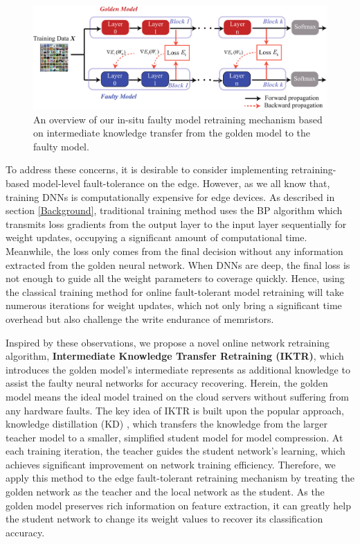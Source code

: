 \begin{figure} 
    \centering
    \includegraphics[width=0.75\linewidth]{images/OL-fig8}
    \caption{An overview of our in-situ faulty model retraining mechanism based on intermediate knowledge transfer from the golden model to the faulty model.}
    \label{fig:insitutraining} 
    \vspace{-15pt}
\end{figure}

To address these concerns, it is desirable to consider implementing retraining-based model-level fault-tolerance on the edge. However, as we all know that, training DNNs is computationally expensive for edge devices. As described in section \ref{Background}, traditional training method uses the BP algorithm which transmits loss gradients from the output layer to the input layer sequentially for weight updates, occupying a significant amount of computational time. Meanwhile, the loss only comes from the final decision without any information extracted from the golden neural network. When DNNs are deep, the final loss is not enough to guide all the weight parameters to coverage quickly. Hence, using the classical training method for online fault-tolerant model retraining will take numerous iterations for weight updates, which not only bring a significant time overhead but also challenge the write endurance of memristors. 
                                                                                                                                                                                                                                                                                                                    
Inspired by these observations, we propose a novel online network retraining algorithm, {\bf Intermediate Knowledge Transfer Retraining (IKTR)}, which introduces the golden model's intermediate represents as additional knowledge to assist the faulty neural networks for accuracy recovering. Herein, the golden model means the ideal model trained on the cloud servers without suffering from any hardware faults. The key idea of IKTR is built upon the popular approach, knowledge distillation (KD) \cite{44873}, which transfers the knowledge from the larger teacher model to a smaller, simplified student model for model compression. At each training iteration, the teacher guides the student network's learning, which achieves significant improvement on network training efficiency. Therefore, we apply this method to the edge fault-tolerant retraining mechanism by treating the golden network as the teacher and the local network as the student. As the golden model preserves rich information on feature extraction, it can greatly help the student network to change its weight values to recover its classification accuracy.

